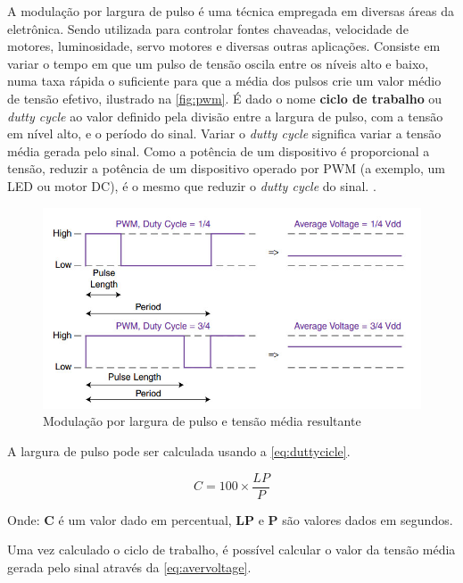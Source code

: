 A modulação por largura de pulso é uma técnica empregada em diversas áreas da eletrônica. Sendo utilizada para controlar fontes chaveadas, velocidade de motores, luminosidade, servo motores e diversas outras aplicações. Consiste em variar o tempo em que um pulso de tensão oscila entre os níveis alto e baixo, numa taxa rápida o suficiente para que a média dos pulsos crie um valor médio de tensão efetivo, ilustrado na \autoref{fig:pwm}. É dado o nome \textbf{ciclo de trabalho} ou \textit{dutty cycle} ao valor definido pela divisão entre a largura de pulso, com a tensão em nível alto, e o período do sinal. Variar o \textit{dutty cycle} significa variar a tensão média gerada pelo sinal. Como a potência de um dispositivo é proporcional a tensão, reduzir a potência de um dispositivo operado por PWM (a exemplo, um LED ou motor DC), é o mesmo que reduzir o \textit{dutty cycle} do sinal. .

\begin{figure}[h]
	\centering
	\includegraphics[width=1\textwidth]{figuras/pwm.jpg}
	\caption{Modulação por largura de pulso e tensão média resultante}
	\label{fig:pwm}
\end{figure}

A largura de pulso pode ser calculada usando a \autoref{eq:duttycicle}.

\begin{equation}
{C} = 100 \times \frac{LP}{P}  
\label{eq:duttycicle}
\end{equation}

Onde: \textbf{C} é um valor dado em percentual, \textbf{LP} e \textbf{P} são valores dados em segundos.\par

Uma vez calculado o ciclo de trabalho, é possível calcular o valor da tensão média gerada pelo sinal através da \autoref{eq:avervoltage}.

